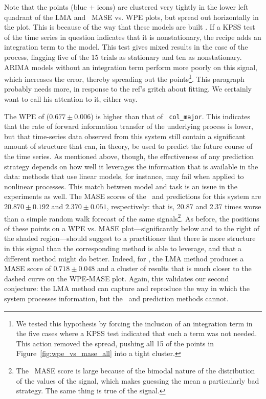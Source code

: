 Note that the \col points (blue {\color{blue}$+$} icons) are clustered
very tightly in the lower left quadrant of the LMA and \naive ~MASE
vs. WPE plots, but spread out horizontally in the \arima plot.
This is because of the way that these models are built
\cite{autoARIMA}.  If a KPSS test of the time series in question
indicates that it is nonstationary, the \arima recipe adds an
integration term to the model.  This test gives mixed results in the
case of the \col process, flagging five of the 15 trials as stationary
and ten as nonstationary.  ARIMA models without an integration term
perform more poorly on this signal, which increases the error, thereby
spreading out the points\footnote{We tested this hypothesis by forcing
  the inclusion of an integration term in the five cases where a KPSS
  test indicated that such a term was not needed.  This action removed
  the spread, pushing all 15 of the \col \arima points in
  Figure~\ref{fig:wpe_vs_mase_all} into a tight cluster.}.
\alert{This paragraph probably needs more, in response to the ref's
  gritch about fitting.  We certainly want to call his attention to
  it, either way.}

The WPE of \svdfive ($0.677 \pm 0.006$) is higher than that of {\tt
  col\_major}.  This indicates that the rate of forward information
transfer of the underlying process is lower, but that time-series data
observed from this system still contain a significant amount of
structure that can, in theory, be used to predict the future course of
the time series.  As mentioned above, though, the effectiveness of any
prediction strategy depends on how well it leverages the information
that is available in the data: methods that use linear models, for
instance, may fail when applied to nonlinear processes.
%
%
This match between model and task is an issue in the \svdfive
experiments as well.  The MASE scores of the \naive ~and \arima
predictions for this system are $20.870 \pm 0.192$ and $2.370 \pm
0.051$, respectively: that is, 20.87 and 2.37 times worse than a
simple random walk forecast of the same signals\footnote{The \naive
  ~MASE score is large because of the bimodal nature of the
  distribution of the values of the signal, which makes guessing the
  mean a particularly bad strategy.  The same thing is true of the
  \svdthree signal.}.  As before, the positions of these points on a
WPE vs. MASE plot---significantly below and to the right of the shaded
region---should suggest to a practitioner that there is more structure
in this signal than the corresponding method is able to leverage, and
that a different method might do better.  Indeed, for \svdfive, the
LMA method produces a MASE score of $ 0.718\pm 0.048 $ and a cluster
of results that is much closer to the dashed curve on the WPE-MASE
plot.  Again, this validates our second conjecture: the LMA method can
capture and reproduce the way in which the \svdfive system processes
information, but the \naive ~and \arima prediction methods cannot.

